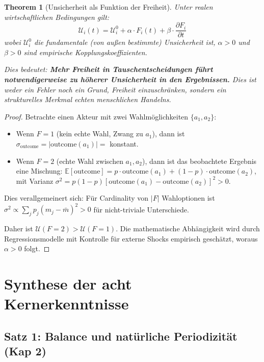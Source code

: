 \documentclass[a4paper, 12pt, twoside, openright]{report}
\newtheorem{theorem}{Theorem}[section]
\theoremstyle{definition}
\theoremstyle{definition}
\begin{document}
\begin{theorem}[Unsicherheit als Funktion der Freiheit]
\label{thm:unsicherheit-freiheit}
Unter realen wirtschaftlichen Bedingungen gilt:
\begin{equation}
\mathcal{U}_i(t) = \mathcal{U}^0_i + \alpha \cdot F_i(t) + \beta \cdot \frac{\partial F_i}{\partial t}
\end{equation}
wobei $\mathcal{U}^0_i$ die fundamentale (von außen bestimmte) Unsicherheit ist, $\alpha > 0$ und $\beta > 0$ sind empirische Kopplungskoeffizienten.

Dies bedeutet: \textbf{Mehr Freiheit in Tauschentscheidungen führt notwendigerweise zu höherer Unsicherheit in den Ergebnissen.} Dies ist weder ein Fehler noch ein Grund, Freiheit einzuschränken, sondern ein strukturelles Merkmal echten menschlichen Handelns.
\end{theorem}

\begin{proof}
Betrachte einen Akteur mit zwei Wahlmöglichkeiten $\{a_1, a_2\}$:
\begin{itemize}
\item Wenn $F = 1$ (kein echte Wahl, Zwang zu $a_1$), dann ist $\sigma_{\text{outcome}} = |\text{outcome}(a_1)| = $ konstant.
\item Wenn $F = 2$ (echte Wahl zwischen $a_1, a_2$), dann ist das beobachtete Ergebnis eine Mischung: $\mathbb{E}[\text{outcome}] = p \cdot \text{outcome}(a_1) + (1-p) \cdot \text{outcome}(a_2)$, mit Varianz $\sigma^2 = p(1-p)[\text{outcome}(a_1) - \text{outcome}(a_2)]^2 > 0$.
\end{itemize}

Dies verallgemeinert sich: Für Cardinality von $|F|$ Wahloptionen ist $\sigma^2 \propto \sum_j p_j(m_j - \bar{m})^2 > 0$ für nicht-triviale Unterschiede.

Daher ist $\mathcal{U}(F=2) > \mathcal{U}(F=1)$. Die mathematische Abhängigkeit wird durch Regressionsmodelle mit Kontrolle für externe Shocks empirisch geschätzt, woraus $\alpha > 0$ folgt.
\end{proof}

\section{Synthese der acht Kernerkenntnisse}

\subsection{Satz 1: Balance und natürliche Periodizität (Kap 2)}
\end{document}
